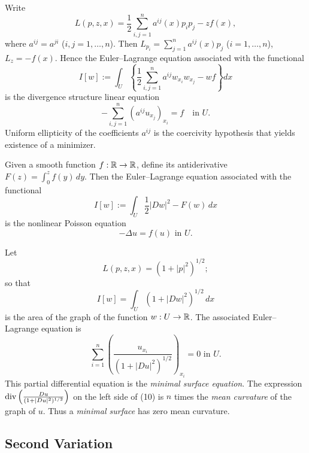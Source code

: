 \begin{example}
\label{ex:generalized-dirichlets-principle}

Write
\[
L(p, z, x) = \frac{1}{2}\sum_{i,j=1}^{n} a^{ij}(x) p_i p_j - zf(x),
\]
where $a^{ij} = a^{ji}$ ($i, j = 1, \ldots, n$). Then $L_{p_i} = \sum_{j=1}^{n} a^{ij}(x) p_j$ ($i = 1, \ldots, n$), $L_z = -f(x)$. Hence the Euler--Lagrange equation associated with the functional
\[
I[w] := \int_U \left\{\frac{1}{2}\sum_{i,j=1}^{n} a^{ij} w_{x_i} w_{x_j} - wf\right\} dx
\]
is the divergence structure linear equation
\[
-\sum_{i,j=1}^{n}(a^{ij} u_{x_j})_{x_i} = f \quad \text{in } U.
\]
Uniform ellipticity of the coefficients $a^{ij}$ is the coercivity hypothesis that yields existence of a minimizer.
\end{example}

\begin{example}
\label{ex:nonlinear-poisson-equation-calculus-of-variations}

Given a smooth function $f : \mathbb{R} \to \mathbb{R}$, define its antiderivative $F(z) = \int_0^z f(y)\, dy$. Then the Euler--Lagrange equation associated with the functional
\[
I[w] := \int_U \frac{1}{2}|Dw|^2 - F(w)\, dx
\]
is the nonlinear Poisson equation
\[
-\Delta u = f(u) \text{ in } U.
\]
\end{example}

\begin{example}
\label{ex:minimal-surfaces-calculus-of-variations}

Let
\[
L(p, z, x) = (1 + |p|^2)^{1/2};
\]
so that
\[
I[w] = \int_U (1 + |Dw|^2)^{1/2} \, dx
\]
is the area of the graph of the function $w : U \to \mathbb{R}$. The associated Euler--Lagrange equation is
\[
\sum_{i=1}^{n} \left( \frac{u_{x_i}}{(1 + |Du|^2)^{1/2}} \right)_{x_i} = 0 \text{ in } U.
\tag{10}
\]
This partial differential equation is the \textit{minimal surface equation}. The expression $\operatorname{div}\left(\frac{Du}{(1+|Du|^2)^{1/2}}\right)$ on the left side of (10) is $n$ times the \textit{mean curvature} of the graph of $u$. Thus a \textit{minimal surface} has zero mean curvature.
\end{example}

\subsection{Second Variation}
\label{sec:second-variation-calculus-of-variations}

